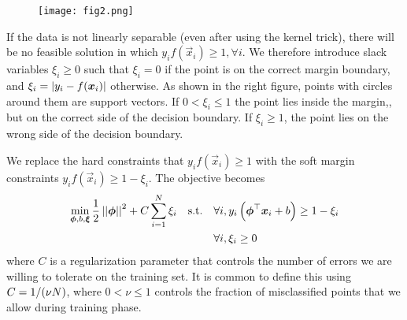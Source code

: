 \begin{wrapfigure}{r}{0.2\textwidth}
	\vspace*{-1.8cm}
	\texttt{[image: fig2.png]}
\end{wrapfigure}
If the data is not linearly separable (even after using the kernel trick), there will be no feasible solution in which $y_if(\vec{x}_i)\geq 1,\forall i$. We therefore introduce slack variables $\xi_i\geq 0$ such that $\xi_i=0$ if the point is on the correct margin boundary, and $\xi_i=\left\vert y_i-f(\boldsymbol{x}_i)\right\vert$ otherwise. As shown in the right figure, points with circles around them are support vectors. If $0<\xi_i\leq 1$ the point lies inside the margin,, but on the correct side of the decision boundary. If $\xi_i\geq 1$, the point lies on the wrong side of the decision boundary.

We replace the hard constraints that $y_if(\vec{x}_i)\geq 1$ with the soft margin constraints $y_if(\vec{x}_i)\geq 1-\xi_i$. The objective becomes
\begin{align*}
	\min_{\boldsymbol{\phi},b,\boldsymbol{\xi}}\frac{1}{2}\left\vert\left\vert \boldsymbol{\phi} \right\vert\right\vert^2+C\sum_{i=1}^N\xi_i\quad\text{s.t.}\quad&\forall i,y_i\left(\boldsymbol{\phi}^\top\boldsymbol{x}_i+b\right)\geq 1-\xi_i \\
	&\forall i,\xi_i\geq 0
\end{align*}
where $C$ is a regularization parameter that controls the number of errors we are willing to tolerate on the training set. It is common to define this using $C=1/(\nu N)$, where $0<\nu\leq 1$ controls the fraction of misclassified points that we allow during training phase.

